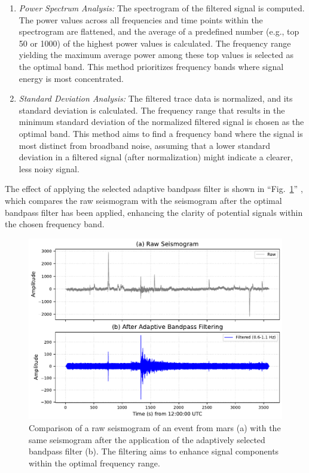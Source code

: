 \documentclass[conference]{IEEEtran}
\begin{document}
            \begin{enumerate}[label=\alph*), leftmargin=3em]
                \item \textit{Power Spectrum Analysis:} The spectrogram of the filtered signal is computed.
                The power values across all frequencies and time points within the spectrogram are flattened, and the average of
                a predefined number (e.g., top 50 or 1000) of the highest power values is calculated. The frequency range
                yielding the maximum average power among these top values is selected as the optimal band. This method
                prioritizes frequency bands where signal energy is most concentrated.
                \item \textit{Standard Deviation Analysis:} The filtered trace data is normalized, and its
                standard deviation is calculated. The frequency range that results in the minimum standard deviation of the
                normalized filtered signal is chosen as the optimal band. This method aims to find a frequency band where the
                signal is most distinct from broadband noise, assuming that a lower standard deviation in a filtered signal
                (after normalization) might indicate a clearer, less noisy signal.
            \end{enumerate}

            The effect of applying the selected adaptive bandpass filter is shown in ``Fig.~\ref{fig:adaptive_filtering_comparison}''
            , which compares the raw seismogram with the seismogram after the optimal bandpass filter has been applied, 
            enhancing the clarity of potential signals within the chosen frequency band.
            \begin{figure}[htbp]
                \centerline{\includegraphics[width=0.9\columnwidth]{figures/fig2_adaptive_bandpass.pdf}}
                \caption{Comparison of a raw seismogram of an event from mars (a) with the same seismogram after the application 
                of the adaptively selected bandpass filter (b). The filtering aims to enhance signal 
                components within the optimal frequency range.}
                \label{fig:adaptive_filtering_comparison} 
            \end{figure}
\end{document}
